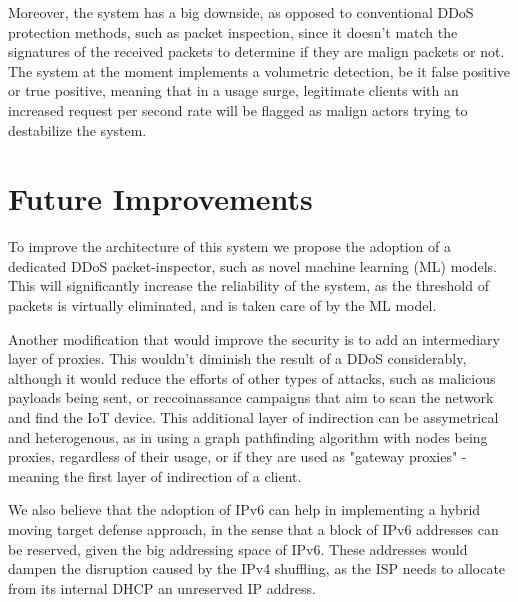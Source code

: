 Moreover, the system has a big downside, as opposed to conventional DDoS protection methods, such as packet inspection, since it doesn't match the signatures of the received packets to determine if they are malign packets or not. The system at the moment implements a volumetric detection, be it false positive or true positive, meaning that in a usage surge, legitimate clients with an increased request per second rate will be flagged as malign actors trying to destabilize the system.

\section{Future Improvements}

To improve the architecture of this system we propose the adoption of a dedicated DDoS packet-inspector, such as novel machine learning (ML) models. This will significantly increase the reliability of the system, as the threshold of packets is virtually eliminated, and is taken care of by the ML model. 

Another modification that would improve the security is to add an intermediary layer of proxies. This wouldn't diminish the result of a DDoS considerably, although it would reduce the efforts of other types of attacks, such as malicious payloads being sent, or reccoinassance campaigns that aim to scan the network and find the IoT device. This additional layer of indirection can be assymetrical and heterogenous, as in using a graph pathfinding algorithm with nodes being proxies, regardless of their usage, or if they are used as "gateway proxies" - meaning the first layer of indirection of a client. 

We also believe that the adoption of IPv6 can help in implementing a hybrid moving target defense approach, in the sense that a block of IPv6 addresses can be reserved, given the big addressing space of IPv6. These addresses would dampen the disruption caused by the IPv4 shuffling, as the ISP needs to allocate from its internal DHCP an unreserved IP address.
 